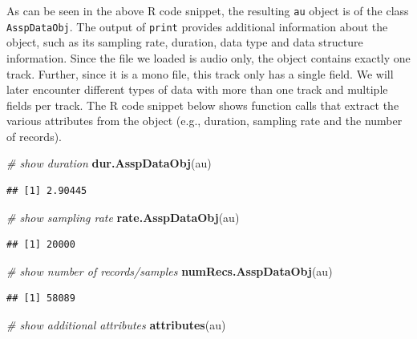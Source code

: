 \documentclass[]{book}
\newenvironment{Shaded}{\begin{snugshade}}{\end{snugshade}}
\newcommand{\CommentTok}[1]{\textcolor[rgb]{0.56,0.35,0.01}{\textit{#1}}}
\newcommand{\KeywordTok}[1]{\textcolor[rgb]{0.13,0.29,0.53}{\textbf{#1}}}
\newcommand{\NormalTok}[1]{#1}
\begin{document}
As can be seen in the above R code snippet, the resulting \texttt{au} object is of the class \texttt{AsspDataObj}. The output of \texttt{print} provides additional information about the object, such as its sampling rate, duration, data type and data structure information. Since the file we loaded is audio only, the object contains exactly one track. Further, since it is a mono file, this track only has a single field. We will later encounter different types of data with more than one track and multiple fields per track. The R code snippet below shows function calls that extract the various attributes from the object (e.g., duration, sampling rate and the number of records).

\begin{Shaded}
\begin{Highlighting}[]
\CommentTok{# show duration}
\KeywordTok{dur.AsspDataObj}\NormalTok{(au)}
\end{Highlighting}
\end{Shaded}

\begin{verbatim}
## [1] 2.90445
\end{verbatim}

\begin{Shaded}
\begin{Highlighting}[]
\CommentTok{# show sampling rate}
\KeywordTok{rate.AsspDataObj}\NormalTok{(au)}
\end{Highlighting}
\end{Shaded}

\begin{verbatim}
## [1] 20000
\end{verbatim}

\begin{Shaded}
\begin{Highlighting}[]
\CommentTok{# show number of records/samples}
\KeywordTok{numRecs.AsspDataObj}\NormalTok{(au)}
\end{Highlighting}
\end{Shaded}

\begin{verbatim}
## [1] 58089
\end{verbatim}

\begin{Shaded}
\begin{Highlighting}[]
\CommentTok{# show additional attributes}
\KeywordTok{attributes}\NormalTok{(au)}
\end{Highlighting}
\end{Shaded}
\end{document}
